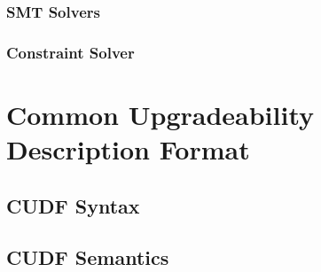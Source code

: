 \subsubsection{SMT Solvers}
\subsubsection{Constraint Solver}

\section{Common Upgradeability Description Format}
{}\cite{treinen2009common}



\subsection{CUDF Syntax}




\subsection{CUDF Semantics}


